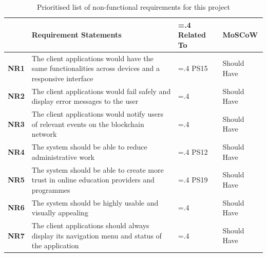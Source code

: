 \begin{table}[!h]
	\caption{Prioritised list of non-functional requirements for this project}
	\centering
	\label{table:nonfx-reqs}
	\begin{tabularx}{\textwidth}{>{\bfseries}l>{\hsize=1.6\hsize}X>{\hsize=.4\hsize}Xl}
		                       & Requirement Statements                                                          & Related To  & MoSCoW
		\\\toprule
		NR1                    & The client applications would have the same functionalities across devices and
		a responsive interface & PS15                                                                            & Should Have
		\\\midrule
		NR2                    & The client applications would fail safely and display error messages
		to the user       &                                                                                 & Should Have
		\\\midrule
		NR3                    & The client applications would notify users of relevant events on the blockchain
		network                &                                                                                 & Should Have
		\\\midrule
		NR4                    & The system should be able to reduce administrative work                         & PS12        & Should Have
		\\\midrule
		NR5                    & The system should be able to create more trust in online education providers
		and programmes         & PS19                                                                            & Should Have
		\\\midrule
		NR6                    & The system should be highly usable and visually appealing                       &             & Should Have
		\\\midrule
NR7 & The client applications should always display its navigation menu and status of the application & & Should Have
		\\\bottomrule
	\end{tabularx}
\end{table}